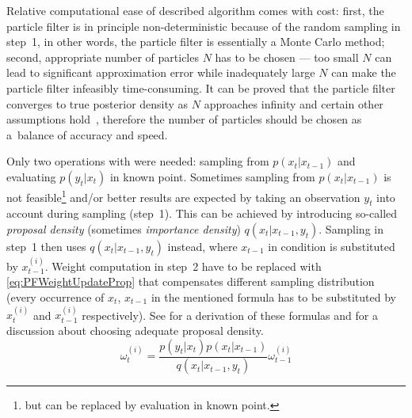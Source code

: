 Relative computational ease of described algorithm comes with
cost: first, the particle filter is in principle non-deterministic because of the random sampling in
step~1, in other words, the particle filter is essentially a Monte Carlo method; second, appropriate
number of particles \(N\) has to be chosen --- too small \(N\) can lead to significant approximation
error while inadequately large \(N\) can make the particle filter infeasibly time-consuming. It can be
proved that the particle filter converges to true posterior density as \(N\) approaches
infinity and certain other assumptions hold~\cite{CriDou:02}, therefore the number of particles
should be chosen as a~balance of accuracy and speed.

Only two operations with {\pdfs} were needed: sampling from \(p(x_t|x_{t-1})\) and evaluating
\(p(y_t | x_t)\) in known point. Sometimes sampling from \(p(x_t|x_{t-1})\) is not
feasible\footnote{but can be replaced by evaluation in known point.} and/or better results are
expected by taking an observation \(y_t\) into account during sampling (step~1). This can be
achieved by introducing so-called \emph{proposal density} (sometimes \emph{importance density})
\(q(x_t|x_{t-1}, y_t)\). Sampling in step~1 then uses \(q(x_t|x_{t-1}, y_t)\) instead, where \(x_{t-1}\) in
condition is substituted by \(x_{t-1}^{(i)}\). Weight computation in step~2 have to be replaced with
\eqref{eq:PFWeightUpdateProp} that compensates different sampling distribution (every occurrence of
\(x_t\), \(x_{t-1}\) in the mentioned formula has to be substituted by \(x_t^{(i)}\) and \(x_{t-1}^{(i)}\)
respectively). See \cite{AruMasGor:02} for a derivation of these formulas and for a discussion about
choosing adequate proposal density.
\begin{equation} \label{eq:PFWeightUpdateProp}
	\omega_t^{(i)} = \frac{p(y_t|x_t)p(x_t|x_{t-1})}{q(x_t|x_{t-1}, y_t)} \omega_{t-1}^{(i)}
\end{equation}

